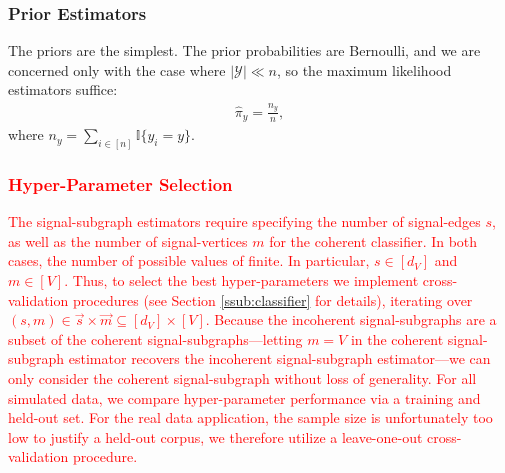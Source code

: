 \documentclass[10pt,journal,cspaper,compsoc]{IEEEtran}
\providecommand{\tr}[1]{\textcolor{red}{#1}}
\newcommand{\II}{\mathbb{I}}           %
\providecommand{\mc}[1]{\mathcal{#1}}
\providecommand{\mv}[1]{\vec{#1}}
\providecommand{\wh}[1]{\widehat{#1}}
\begin{document}



\subsubsection{Prior Estimators} %
\label{sub:prior_estimators}

The priors are the simplest.  The prior probabilities are Bernoulli, and we are concerned only with the case where $|\mc{Y}| \ll n$, so the maximum likelihood estimators suffice:
\begin{align} \label{eq:prior}
\wh{\pi}_y = \frac{n_y}{n},
\end{align}
where $n_y=\sum_{i \in [n]} \II\{y_i = y\}$.




\tr{\subsubsection{Hyper-Parameter Selection}}

\tr{The signal-subgraph estimators require specifying the number of signal-edges $s$, as well as the number of signal-vertices $m$ for the coherent classifier.  In both cases, the number of possible values of finite.  In particular, $s \in [d_V]$ and $m \in [V]$.  Thus, 
to select the best hyper-parameters
we implement cross-validation procedures (see Section \ref{ssub:classifier} for details), iterating over $(s,m) \in \mv{s} \times \mv{m} \subseteq [d_V] \times [V]$. Because the incoherent signal-subgraphs are a subset of the coherent signal-subgraphs---letting $m=V$ in the coherent signal-subgraph estimator recovers the incoherent signal-subgraph estimator---we can only consider the coherent signal-subgraph without loss of generality. 
For all simulated data, we compare hyper-parameter performance via a training and held-out set.  For the real data application, the sample size is unfortunately too low to justify a held-out corpus, we therefore utilize a leave-one-out cross-validation procedure.}    


\end{document}
